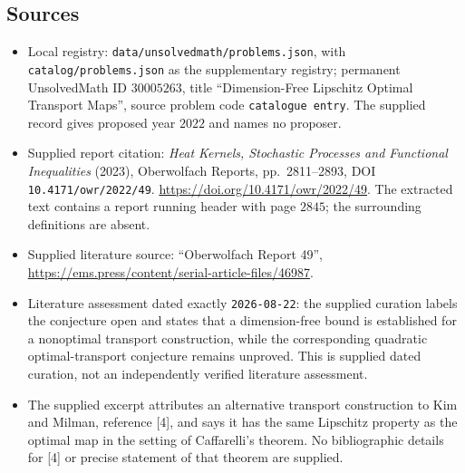 \documentclass[11pt]{article}
\begin{document}
\subsection{Sources}
\begin{itemize}
\item Local registry: \texttt{data/unsolvedmath/problems.json}, with \texttt{catalog/problems.json} as the supplementary registry; permanent UnsolvedMath ID \(30005263\), title ``Dimension-Free Lipschitz Optimal Transport Maps'', source problem code \texttt{catalogue entry}. The supplied record gives proposed year \(2022\) and names no proposer.
\item Supplied report citation: \emph{Heat Kernels, Stochastic Processes and Functional Inequalities} (2023), Oberwolfach Reports, pp.\ 2811--2893, DOI \texttt{10.4171/owr/2022/49}. \url{https://doi.org/10.4171/owr/2022/49}. The extracted text contains a report running header with page \(2845\); the surrounding definitions are absent.
\item Supplied literature source: ``Oberwolfach Report 49'', \url{https://ems.press/content/serial-article-files/46987}.
\item Literature assessment dated exactly \texttt{2026-08-22}: the supplied curation labels the conjecture open and states that a dimension-free bound is established for a nonoptimal transport construction, while the corresponding quadratic optimal-transport conjecture remains unproved. This is supplied dated curation, not an independently verified literature assessment.
\item The supplied excerpt attributes an alternative transport construction to Kim and Milman, reference [4], and says it has the same Lipschitz property as the optimal map in the setting of Caffarelli's theorem. No bibliographic details for [4] or precise statement of that theorem are supplied.
\end{itemize}
\end{document}
